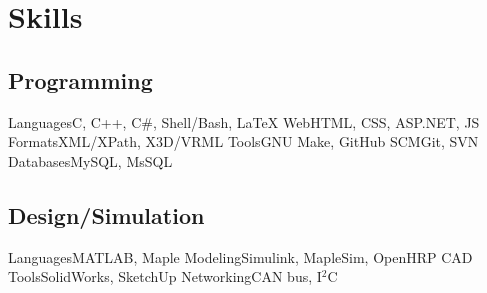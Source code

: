 \section{Skills}

\subsection
	{Programming}
\cvcomputer
	{Languages}{C, C++, C\#, Shell/Bash, \LaTeX{}}
    {Web}{HTML, CSS, ASP.NET, JS}
\cvcomputer
	{Formats}{XML/XPath, X3D/VRML}
	{Tools}{GNU Make, GitHub}
\cvcomputer
	{SCM}{Git, SVN}
    {Databases}{MySQL, MsSQL}

\subsection
	{Design/Simulation}
\cvcomputer
	{Languages}{MATLAB, Maple}
	{Modeling}{Simulink, MapleSim, OpenHRP}
\cvcomputer
	{CAD Tools}{SolidWorks, SketchUp}
	{Networking}{CAN bus, I$^2$C}
